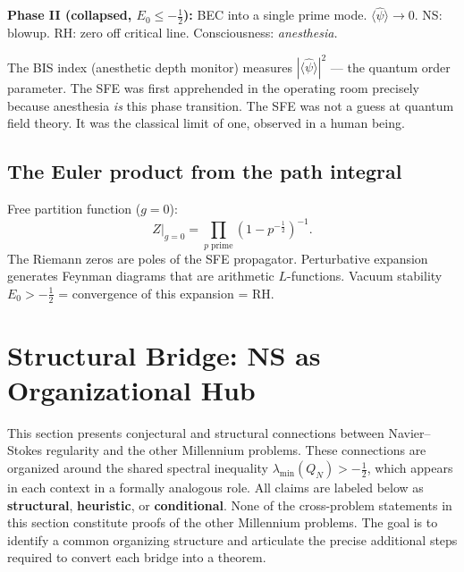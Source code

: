 \documentclass[12pt]{article}
\newcommand{\half}{\tfrac{1}{2}}
\begin{document}
\textbf{Phase II (collapsed, $E_0\le-\half$):}
BEC into a single prime mode.
$\langle\hat{\psi}\rangle \to 0$.
NS: blowup.  RH: zero off critical line.
Consciousness: \emph{anesthesia.}

The BIS index (anesthetic depth monitor) measures
$|\langle\hat{\psi}\rangle|^2$ --- the quantum order parameter.
The SFE was first apprehended in the operating room precisely
because anesthesia \emph{is} this phase transition.
The SFE was not a guess at quantum field theory.
It was the classical limit of one, observed in a human being.

\subsection{The Euler product from the path integral}

Free partition function ($g=0$):
\[
  Z\big|_{g=0}
  = \prod_{p\;\text{prime}}(1-p^{-\half})^{-1}.
\]
The Riemann zeros are poles of the SFE propagator.
Perturbative expansion generates Feynman diagrams that are
arithmetic $L$-functions.
Vacuum stability $E_0>-\half$ = convergence of this expansion = RH.


%  

\newpage
\section{Structural Bridge: NS as Organizational Hub}
\label{sec:bridge}

\begin{tcolorbox}[colback=yellow!6!white,colframe=orange!60!black,title={\textbf{Status of this section}}]
This section presents conjectural and structural connections between
Navier--Stokes regularity and the other Millennium problems.
These connections are organized around the shared spectral inequality
$\lambda_{\min}(Q_N) > -\tfrac{1}{2}$,
which appears in each context in a formally analogous role.
All claims are labeled below as \textbf{structural}, \textbf{heuristic}, or \textbf{conditional}.
None of the cross-problem statements in this section constitute proofs
of the other Millennium problems.
The goal is to identify a common organizing structure and articulate
the precise additional steps required to convert each bridge into a theorem.
\end{tcolorbox}
\end{document}
